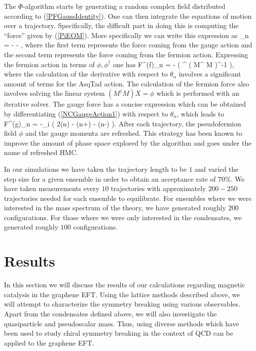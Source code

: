 \documentclass[aps,prd,twocolumn,showpacs,superscriptaddress,groupedaddress]{revtex4}  %
\begin{document}
The $\Phi$-algorithm starts by generating a random complex field distributed according to (\ref{PFGaussIdentity}). One can then integrate the equations of motion over a trajectory. Specifically, the difficult part in doing this is computing the ``force'' given by (\ref{PiEOM}).
More specifically we can write this expression as 
\beq
\dot{\pi}_n = - - , 
\eeq
where the first term represents the force coming from the gauge action and the second term represents the force coming from the fermion action. Expressing the fermion action in terms of $\phi, \phi^{\dagger}$ one has
\beq
\label{FermionForce}
F^{(f)}_n = -  \left( \phi^{\dagger} \left( M^{\dagger} M \right)^{-1}  \phi \right), 
\eeq
where the calculation of the derivative with respect to $\theta_n$ involves a significant amount of terms for the AsqTad action. The calculation of the fermion force also involves solving the linear system $\left( M^{\dagger}M \right) X = \phi$ which is performed with an iterative solver.
The gauge force has a concise expression which can be obtained by differentiating (\ref{NCGaugeAction1}) with respect to $\theta_n$, which leads to
\beq
\label{GaugeForce}
F^{(g)}_n = -\beta \sum_i \left( 2\theta(n) - \theta(n+) - \theta(n-) \right).
\eeq
After each trajectory, the pseudofermion field $\phi$ and the gauge momenta are refreshed. This strategy has been known to improve the amount of phase space explored by the algorithm and goes
under the name of refreshed HMC.

In our simulations we have taken the trajectory length to be $1$ and varied the step size for a given ensemble in order to obtain an acceptance rate of $70 \%$. We have
taken measurements every $10$ trajectories with approximately $200-250$ trajectories needed for each ensemble to equilibrate. For ensembles where we were interested in the mass spectrum of the theory,
we have generated roughly $200$ configurations. For those where we were only interested in the condensates, we generated roughly $100$ configurations.
\section{\label{sec:Results}Results}

In this section we will discuss the results of our calculations regarding magnetic catalysis in the graphene EFT. Using the lattice methods described above, we will attempt to characterize the symmetry breaking using various observables.
Apart from the condensates defined above, we will also investigate the quasiparticle and pseudoscalar mass. Thus, using diverse methods which have been used to study chiral symmetry breaking in the
context of QCD can be applied to the graphene EFT.
\end{document}
